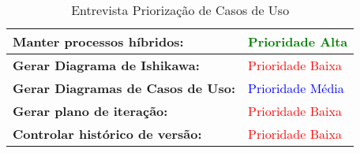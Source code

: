 \begin{table}[H]
\begin{tabular}{|p{7cm}|p{3cm}|}
\textbf{Manter processos híbridos:} &
\textcolor{green}{Prioridade Alta}
\\ \hline
\textbf{Gerar Diagrama de Ishikawa:} &
\textcolor{red}{Prioridade Baixa}
\\ \hline
\textbf{Gerar Diagramas de Casos de Uso:} &
\textcolor{blue}{Prioridade Média}
\\ \hline
\textbf{Gerar plano de iteração:} &
\textcolor{red}{Prioridade Baixa}
\\ \hline
\textbf{Controlar histórico de versão:} &
\textcolor{red}{Prioridade Baixa}
\\ \hline
\end{tabular}
\caption{Entrevista Priorização de Casos de Uso}
\label{tab:frameworkproblema}
\end{table}
